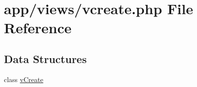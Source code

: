 \hypertarget{vcreate_8php}{}\section{app/views/vcreate.php File Reference}
\label{vcreate_8php}
\subsection*{Data Structures}
\begin{DoxyCompactItemize}
\item 
class \hyperlink{classvCreate}{v\+Create}
\end{DoxyCompactItemize}
